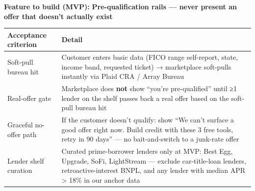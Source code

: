 \documentclass[
  10pt,
]{article}
\begin{document}
\textbf{Feature to build (MVP):} \textbf{Pre-qualification rails --- never present an offer that
doesn't actually exist}

\begin{longtable}[]{@{}ll@{}}
\toprule
\begin{minipage}[b]{0.47\columnwidth}\raggedright
Acceptance criterion\strut
\end{minipage} & \begin{minipage}[b]{0.47\columnwidth}\raggedright
Detail\strut
\end{minipage}\tabularnewline
\midrule
\endhead
\begin{minipage}[t]{0.47\columnwidth}\raggedright
Soft-pull bureau hit\strut
\end{minipage} & \begin{minipage}[t]{0.47\columnwidth}\raggedright
Customer enters basic data (FICO range self-report, state, income band, requested ticket) →
marketplace soft-pulls instantly via Plaid CRA / Array Bureau\strut
\end{minipage}\tabularnewline
\begin{minipage}[t]{0.47\columnwidth}\raggedright
Real-offer gate\strut
\end{minipage} & \begin{minipage}[t]{0.47\columnwidth}\raggedright
Marketplace does \textbf{not} show ``you're pre-qualified'' until ≥1 lender on the shelf passes back
a real offer based on the soft-pull bureau hit\strut
\end{minipage}\tabularnewline
\begin{minipage}[t]{0.47\columnwidth}\raggedright
Graceful no-offer path\strut
\end{minipage} & \begin{minipage}[t]{0.47\columnwidth}\raggedright
If the customer doesn't qualify: show ``We can't surface a good offer right now. Build credit with
these 3 free tools, retry in 90 days'' --- no bait-and-switch to a junk-rate offer\strut
\end{minipage}\tabularnewline
\begin{minipage}[t]{0.47\columnwidth}\raggedright
Lender shelf curation\strut
\end{minipage} & \begin{minipage}[t]{0.47\columnwidth}\raggedright
Curated prime-borrower lenders only at MVP: Best Egg, Upgrade, SoFi, LightStream --- exclude
car-title-loan lenders, retroactive-interest BNPL, and any lender with median APR \textgreater{}
18\% in our anchor data\strut
\end{minipage}\tabularnewline
\bottomrule
\end{longtable}
\end{document}
